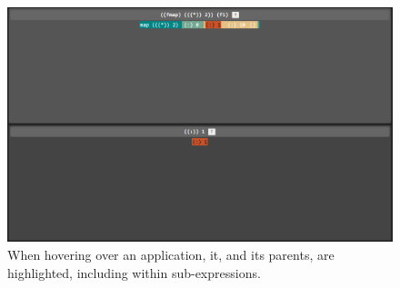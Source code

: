 \begin{figure}
    \centering
    \includegraphics[width=\linewidth]{chapters/5-implementation/images/hover.png}
    \caption{When hovering over an application, it, and its parents, are highlighted, including within sub-expressions.}
    \label{fig:hover}
\end{figure}